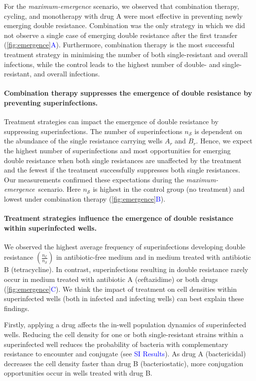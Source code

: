 \documentclass[9pt,twocolumn,twoside,lineno]{pnas-new}
\newcommand{\sisec}[1]{\textcolor{blue}{#1}}
\newcommand{\panelref}[2]{\autoref{#1}\textcolor{blue}{#2}}
\begin{document}
    For the \textit{maximum-emergence} scenario, we observed that combination therapy, cycling, and monotherapy with drug A were most effective in preventing newly emerging double resistance. 
    Combination was the only strategy in which we did not observe a single case of emerging double resistance after the first transfer (\panelref{fig:emergence}{A}).
    Furthermore, combination therapy is the most successful treatment strategy in minimising the number of both single-resistant and overall infections, while the control leads to the highest number of double- and single-resistant, and overall infections.
    
    \paragraph{Combination therapy suppresses the emergence of double resistance by preventing superinfections.}
    Treatment strategies can impact the emergence of double resistance by suppressing superinfections.
    The number of superinfections $n_\mathcal{S}$ is dependent on the abundance of the single resistance carrying wells $A_r$ and $B_r$.
    Hence, we expect the highest number of superinfections and most opportunities for emerging double resistance when both single resistances are unaffected by the treatment and the fewest if the treatment successfully suppresses both single resistances. 
    Our measurements confirmed these expectations during the \textit{maximum-emergence}~scenario.
    Here $n_\mathcal{S}$ is highest in the control group (no treatment) and lowest under combination therapy (\panelref{fig:emergence}{B}).
    
    \paragraph{Treatment strategies influence the emergence of double resistance within superinfected wells.}
    We observed the highest average frequency of superinfections developing double resistance $(\frac{n_\mathcal{E}}{n_\mathcal{S}})$ in antibiotic-free medium and in medium treated with antibiotic B (tetracycline). 
    In contrast, superinfections resulting in double resistance rarely occur in medium treated with antibiotic A (ceftazidime) or both drugs (\panelref{fig:emergence}{C}).
    We think the impact of treatment on cell densities within superinfected wells (both in infected and infecting wells) can best explain these findings.
    
    Firstly, applying a drug affects the in-well population dynamics of superinfected wells.
    Reducing the cell density for one or both single-resistant strains within a superinfected well reduces the probability of bacteria with complementary resistance to encounter and conjugate (see \sisec{SI Results}). 
    As drug A (bactericidal) decreases the cell density faster than drug B (bacteriostatic), more conjugation opportunities occur in wells treated with drug B.
    
\end{document}
